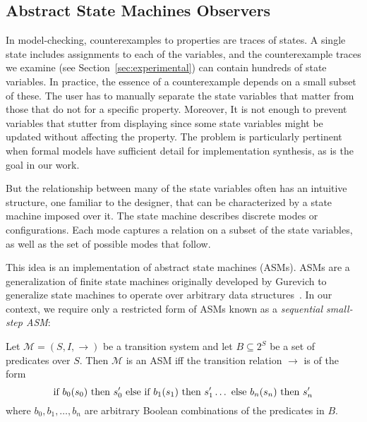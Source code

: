 \documentclass{llncs/llncs}
\newcommand{\lee}[1]{ } %
\newcommand{\lee}[1]{ {\color{blue}$<$lee: #1$>$} } %
\begin{document}
\subsection{Abstract State Machines Observers}\label{sec:abstract}\label{sec:asms}
\lee{These are really observers. Let's call them abstract state machine observers and add a bit of the synchronous observers text here. Also, cite disjunctive invariants paper?}

In model-checking, counterexamples to properties are traces of states. A single state includes assignments to each of the variables, and the counterexample traces we examine (see Section~\ref{sec:experimental}) can contain hundreds of state variables. In practice, the essence of a counterexample depends on a small subset of these. The user has to manually separate the state variables that matter from those that do not for a specific property. Moreover, It is not enough to prevent variables that stutter from displaying since some state variables might be updated without affecting the property. The problem is particularly pertinent when formal models have sufficient detail for implementation synthesis, as is the goal in our work.



But the relationship between many of the state variables often has an intuitive structure, one familiar to the designer, that can be characterized by a state machine imposed over it. The state machine describes discrete modes or configurations. Each mode captures a relation on a subset of the state variables, as well as the set of possible modes that follow.

This idea is an implementation of abstract state machines (ASMs). ASMs are a generalization of finite state machines originally developed by Gurevich to generalize state machines to operate over arbitrary data structures~\cite{asm}. In our context, we require only a restricted form of ASMs known as a \emph{sequential small-step ASM}:

\begin{definition}

\lee{Ben will redo. I'd just remove the Gurevich reference}

Let $\mathcal{M} = (S, I, \rightarrow)$ be a transition system and let $B \subseteq 2^S$ be a set of predicates over $S$. Then $\mathcal{M}$ is an ASM iff the transition relation $\rightarrow$ is of the form
$$\textnormal{if } b_0(s_0) \textnormal{ then } s'_0 \textnormal{ else if } b_1(s_1) \textnormal{ then } s'_1 \ldots \textnormal{ else } b_n(s_n) \textnormal{ then } s'_n$$
\noindent
where $b_0, b_1, \ldots, b_n$ are arbitrary Boolean combinations of the predicates in $B$.
\end{definition}
\end{document}
